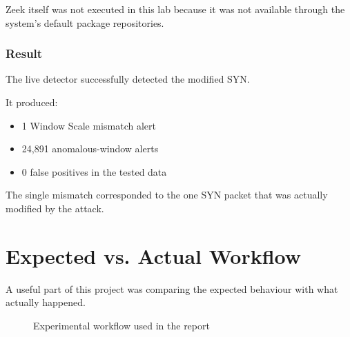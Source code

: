 \documentclass[11pt]{article}
\begin{document}
Zeek itself was not executed in this lab because it was not available
through the system's default package repositories.

\subsubsection*{Result}

The live detector successfully detected the modified SYN.

It produced:

\begin{itemize}
    \item 1 Window Scale mismatch alert
    \item 24,891 anomalous-window alerts
    \item 0 false positives in the tested data
\end{itemize}

The single mismatch corresponded to the one SYN packet that was
actually modified by the attack.

\section{Expected vs. Actual Workflow}

A useful part of this project was comparing the expected behaviour
with what actually happened.

\begin{figure}[h]
\centering
{}
\caption{Experimental workflow used in the report}
\end{figure}
\end{document}
